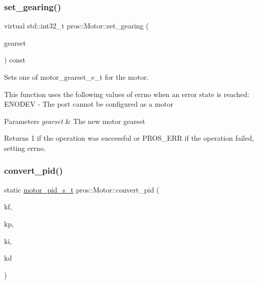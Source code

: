 \subsubsection{\texorpdfstring{set\+\_\+gearing()}{set\_gearing()}}
{\footnotesize\ttfamily virtual std\+::int32\+\_\+t pros\+::\+Motor\+::set\+\_\+gearing (\begin{DoxyParamCaption}\item[{const \hyperlink{motors_8h_aa2f1c305c998abc3bf8dd1f76fa4da8b}{motor\+\_\+gearset\+\_\+e\+\_\+t}}]{gearset }\end{DoxyParamCaption}) const\hspace{0.3cm}{\ttfamily [virtual]}}



Sets one of motor\+\_\+gearset\+\_\+e\+\_\+t for the motor. 

This function uses the following values of errno when an error state is reached\+: E\+N\+O\+D\+EV -\/ The port cannot be configured as a motor


\begin{DoxyParams}{Parameters}
{\em gearset} & The new motor gearset\\
\hline
\end{DoxyParams}
\begin{DoxyReturn}{Returns}
1 if the operation was successful or P\+R\+O\+S\+\_\+\+E\+RR if the operation failed, setting errno. 
\end{DoxyReturn}
\mbox{\label{classpros_1_1Motor_adca7af38b0357c254e81ed882a2283a0}} 
\subsubsection{\texorpdfstring{convert\+\_\+pid()}{convert\_pid()}}
{\footnotesize\ttfamily static \hyperlink{motors_8h_ad2e907c8d7ce53c1fd91f1b9801072e3}{motor\+\_\+pid\+\_\+s\+\_\+t} pros\+::\+Motor\+::convert\+\_\+pid (\begin{DoxyParamCaption}\item[{double}]{kf,  }\item[{double}]{kp,  }\item[{double}]{ki,  }\item[{double}]{kd }\end{DoxyParamCaption})\hspace{0.3cm}{\ttfamily [static]}}



